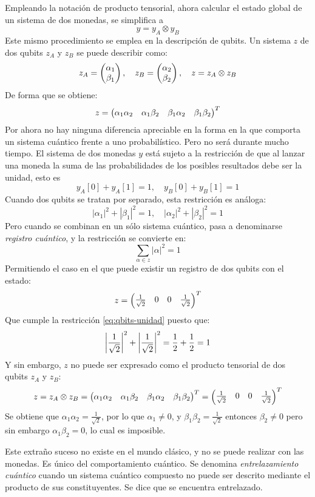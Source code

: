 Empleando la notación de producto tensorial, ahora calcular el estado global de 
un sistema de dos monedas, se simplifica a
%
$$ y = y_A \otimes y_B $$
%
Este mismo procedimiento se emplea en la descripción de qubits. Un sistema $z$ 
de dos qubits $z_A$ y $z_B$ se puede describir como:
%
$$
z_A = \begin{pmatrix} \alpha_1 \\ \beta_1 \end{pmatrix}, \quad
z_B = \begin{pmatrix} \alpha_2 \\ \beta_2 \end{pmatrix}, \quad
z = z_A \otimes z_B $$
%
De forma que se obtiene:
%
$$
z = \begin{pmatrix} \alpha_1 \alpha_2 & \alpha_1 \beta_2
	& \beta_1 \alpha_2 & \beta_1 \beta_2 \end{pmatrix}^T $$
%
Por ahora no hay ninguna diferencia apreciable en la forma en la que comporta un 
sistema cuántico frente a uno probabilístico. Pero no será durante mucho tiempo.
El sistema de dos monedas $y$ está sujeto a la restricción de que al lanzar una 
moneda la suma de las probabilidades de los posibles resultados debe ser la 
unidad, esto es
%
$$ y_A[0] + y_A[1] = 1, \quad y_B[0] + y_B[1] = 1$$
%
Cuando dos qubits se tratan por separado, esta restricción es análoga:
%
$$|\alpha_1|^2 + |\beta_1|^2 = 1, \quad |\alpha_2|^2 + |\beta_2|^2 = 1$$
%
Pero cuando se combinan en un sólo sistema cuántico, pasa a denominarse 
\textit{registro cuántico}, y la restricción se convierte en:
\begin{equation}
\label{eq:qbits-unidad}
\sum_{\alpha \in z} |\alpha|^2 = 1
\end{equation}
%
Permitiendo el caso en el que puede existir un registro de dos qubits con el 
estado:
$$ z = \begin{pmatrix} \frac{1}{\sqrt{2}} & 0 & 0 & \frac{1}{\sqrt{2}} \end{pmatrix}^T $$
Que cumple la restricción \eqref{eq:qbits-unidad} puesto que:
$$ \left|\frac{1}{\sqrt{2}}\right|^2 + \left|\frac{1}{\sqrt{2}}\right|^2 = \frac{1}{2} + 
\frac{1}{2} = 
1 $$
Y sin embargo, $z$ no puede ser expresado como el producto tensorial de dos 
qubits $z_A$ y $z_B$:
$$ z = z_A \otimes z_B = \begin{pmatrix} \alpha_1 \alpha_2 & \alpha_1 \beta_2
	& \beta_1 \alpha_2 & \beta_1 \beta_2 \end{pmatrix}^T = \begin{pmatrix} \frac{1}{\sqrt{2}} & 0 & 0 & 
\frac{1}{\sqrt{2}} \end{pmatrix}^T
$$
Se obtiene que $\alpha_1 \alpha_2 = \frac{1}{\sqrt{2}}$, por lo que $\alpha_1 
\neq 0$, y $\beta_1 \beta_2 = \frac{1}{\sqrt{2}}$ entonces $\beta_2 \neq 0$ 
pero sin embargo $\alpha_1 \beta_2 = 0$, lo cual es imposible.

Este extraño suceso no existe en el mundo clásico, y no se puede realizar con 
las monedas. Es único del comportamiento cuántico. Se denomina 
\textit{entrelazamiento cuántico} cuando un sistema cuántico compuesto no puede 
ser descrito mediante el producto de sus constituyentes. Se dice que se 
encuentra entrelazado.

